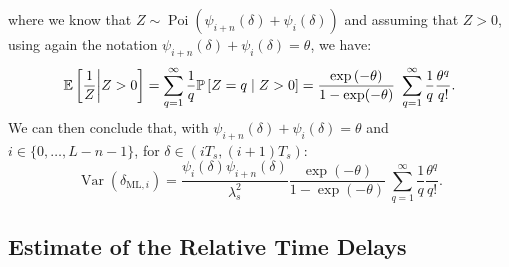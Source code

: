 where we know that \(Z\sim \operatorname{Poi}(\psi_{i+n}(\delta)+\psi_{i}(\delta))\) and assuming that \(Z>0\), using again the notation \(\psi_{i+n}(\delta)+\psi_{i}(\delta)=\theta\), we have:
\begin{equation}
\mathbb{E}\left[{\frac{1}{Z}\bigg|Z>0}\right]=\sum_{q=1}^{\infty} \frac{1}{q}\mathbb{P}\left[{Z=q\mid Z>0}\right]
=\frac{\exp\left(-\theta\right)}{1-\exp(-\theta)}\
\sum_{q=1}^{\infty} \frac{1}{q}\frac{\theta^q}{q!}.
\end{equation}
We can then conclude that, with \(\psi_{i+n}(\delta)+\psi_{i}(\delta)=\theta\) and \(i\in\{0, \ldots, L-n-1\}\), for \(\delta \in(iT_s,(i+1)T_s)\):
\begin{equation}
\operatorname{Var}\left(\delta_{\mathrm{ML},i}\right)
=\frac{\psi_i(\delta) \psi_{i+n}(\delta)}{\lambda_s^2}
\frac{\exp\left(-\theta\right)}{1-\exp(-\theta)}\
\sum_{q=1}^{\infty} \frac{1}{q}\frac{\theta^q}{q!}.
\label{eq:thevariancione}
\end{equation}

\noindent
\textit{\color{blue}{(Plot with CRLB comparison.)}}

\subsection{Estimate of the Relative Time Delays}

